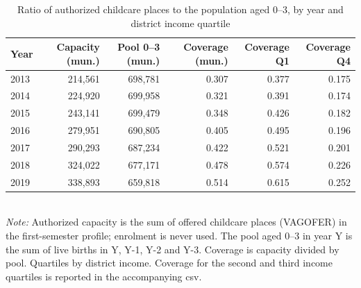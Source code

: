 \begin{table}[htbp]\centering
\caption{Ratio of authorized childcare places to the population aged 0--3, by year and district income quartile}
\label{tab:S6c_cobertura}
\small
\begin{tabular}{lrrrrr}
\toprule
Year & Capacity (mun.) & Pool 0--3 (mun.) & Coverage (mun.) & Coverage Q1 & Coverage Q4 \\
\midrule
2013 & 214,561 & 698,781 & 0.307 & 0.377 & 0.175 \\
2014 & 224,920 & 699,958 & 0.321 & 0.391 & 0.174 \\
2015 & 243,141 & 699,479 & 0.348 & 0.426 & 0.182 \\
2016 & 279,951 & 690,805 & 0.405 & 0.495 & 0.196 \\
2017 & 290,293 & 687,234 & 0.422 & 0.521 & 0.201 \\
2018 & 324,022 & 677,171 & 0.478 & 0.574 & 0.226 \\
2019 & 338,893 & 659,818 & 0.514 & 0.615 & 0.252 \\
\bottomrule
\end{tabular}
\\[3pt]{\footnotesize \textit{Note:} Authorized capacity is the sum of offered childcare places (VAGOFER) in the first-semester profile; enrolment is never used. The pool aged 0--3 in year Y is the sum of live births in Y, Y-1, Y-2 and Y-3. Coverage is capacity divided by pool. Quartiles by district income. Coverage for the second and third income quartiles is reported in the accompanying csv.}
\end{table}
